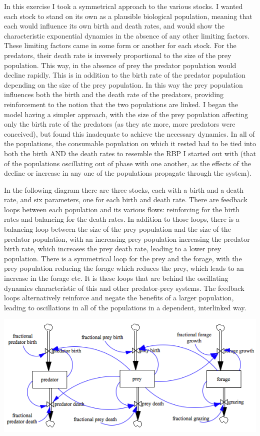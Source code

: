 \documentclass[12pt]{article}
\begin{document}
In this exercise I took a symmetrical approach to the various stocks.  I wanted each stock to stand on its own as a plausible biological population, meaning that each would influence its own birth and death rates, and would show the characteristic exponential dynamics in the absence of any other limiting factors.  These limiting factors came in some form or another for each stock.  For the predators, their death rate is inversely proportional to the size of the prey population.  This way, in the absence of prey the predator population would decline rapidly.  This is in addition to the birth rate of the predator population depending on the size of the prey population.  In this way the prey population influences both the birth and the death rate of the predators, providing reinforcement to the notion that the two populations are linked.  I began the model having a simpler approach, with the size of the prey population affecting only the birth rate of the predators (as they ate more, more predators were conceived), but found this inadequate to achieve the necessary dynamics.  In all of the populations, the consumable population on which it rested had to be tied into both the birth AND the death rates to resemble the RBP I started out with (that of the populations oscillating out of phase with one another, as the effects of the decline or increase in any one of the populations propagate through the system).  

In the following diagram there are three stocks, each with a birth and a death rate, and six parameters, one for each birth and death rate.  There are feedback loops between each population and its various flows: reinforcing for the birth rates and balancing for the death rates.  In addition to those loops, there is a balancing loop between the size of the prey population and the size of the predator population, with an increasing prey population increasing the predator birth rate, which increases the prey death rate, leading to a lower prey population.  There is a symmetrical loop for the prey and the forage, with the prey population reducing the forage which reduces the prey, which leads to an increase in the forage etc.  It is these loops that are behind the oscillating dynamics characteristic of this and other predator-prey systems.  The feedback loops alternatively reinforce and negate the benefits of a larger population, leading to oscillations in all of the populations in a dependent, interlinked way.  

\includegraphics[scale=0.63]{exercise2model.png}
\end{document}
